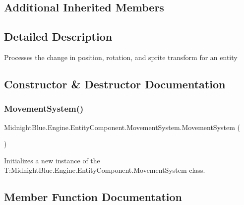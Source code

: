 \subsection*{Additional Inherited Members}


\subsection{Detailed Description}
Processes the change in position, rotation, and sprite transform for an entity 



\subsection{Constructor \& Destructor Documentation}
\hypertarget{class_midnight_blue_1_1_engine_1_1_entity_component_1_1_movement_system_a9f5770865523778efec6490954390c13}{}\label{class_midnight_blue_1_1_engine_1_1_entity_component_1_1_movement_system_a9f5770865523778efec6490954390c13} 
\subsubsection{\texorpdfstring{Movement\+System()}{MovementSystem()}}
{\footnotesize\ttfamily Midnight\+Blue.\+Engine.\+Entity\+Component.\+Movement\+System.\+Movement\+System (\begin{DoxyParamCaption}{ }\end{DoxyParamCaption})\hspace{0.3cm}{\ttfamily [inline]}}



Initializes a new instance of the T\+:\+Midnight\+Blue.\+Engine.\+Entity\+Component.\+Movement\+System class. 



\subsection{Member Function Documentation}
\hypertarget{class_midnight_blue_1_1_engine_1_1_entity_component_1_1_movement_system_a7424e4fc15c75e0f663d31110fe6792a}{}\label{class_midnight_blue_1_1_engine_1_1_entity_component_1_1_movement_system_a7424e4fc15c75e0f663d31110fe6792a} 
